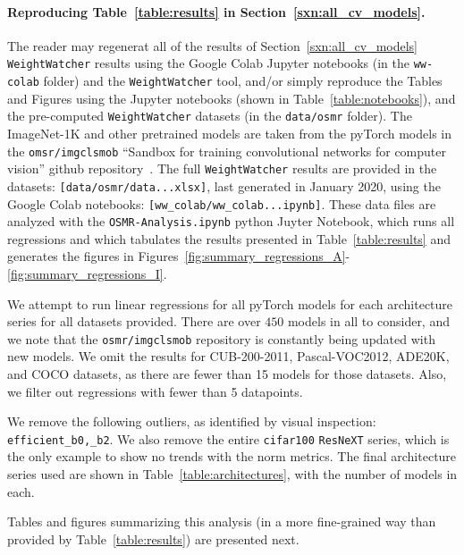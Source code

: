 \paragraph{Reproducing Table~\ref{table:results} in Section~\ref{sxn:all_cv_models}. }

The reader may regenerat all of the  results of Section~\ref{sxn:all_cv_models} 
\texttt{WeightWatcher} results using the Google Colab Jupyter notebooks (in the \texttt{ww-colab} folder)
and  the \texttt{WeightWatcher} tool, 
and/or simply reproduce the Tables and Figures using the Jupyter notebooks (shown in Table~\ref{table:notebooks}),
and the pre-computed \texttt{WeightWatcher} datasets (in the \texttt{data/osmr} folder).
The ImageNet-1K and other pretrained models are taken from the pyTorch models in the \texttt{omsr/imgclsmob} 
``Sandbox for training convolutional networks for computer vision'' github repository~\cite{osmr}.
The full  \texttt{WeightWatcher} results are provided in the datasets: \texttt{[data/osmr/data...xlsx]},
last generated in January 2020, using the Google Colab notebooks: \texttt{[ww\_colab/ww\_colab...ipynb]}.
These data files are analyzed with the \texttt{OSMR-Analysis.ipynb} python Juyter Notebook,
which runs all regressions and which tabulates the results presented in Table~\ref{table:results}
and generates the figures in Figures~\ref{fig:summary_regressions_A}-\ref{fig:summary_regressions_I}.

We attempt to run linear regressions for all pyTorch models for each architecture series for all datasets provided.  
There are over $450$ models in all to consider, and we note that the \texttt{osmr/imgclsmob} repository is constantly being updated with new models.
We omit the results for CUB-200-2011, Pascal-VOC2012, ADE20K, and COCO datasets, as there are fewer than 15 models for those datasets.  
Also, we filter out regressions with fewer than 5 datapoints.

We remove the following outliers, as identified by visual inspection: \texttt{efficient\_b0,\_b2}.
We also remove the entire \texttt{cifar100} \texttt{ResNeXT} series, which is the only example to show no trends with the norm metrics.
%
The final architecture series used are shown in  Table~\ref{table:architectures}, with the number of models in each.

Tables and figures summarizing this analysis (in a more fine-grained way than provided by Table~\ref{table:results}) are presented next.


